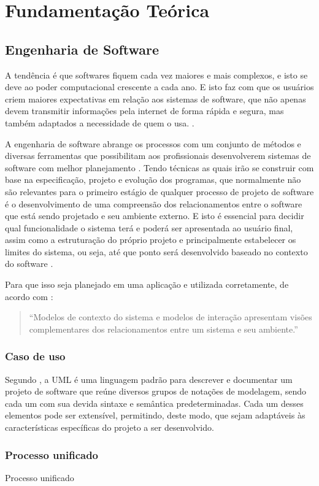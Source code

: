 \chapter{Fundamentação Teórica}\label{chp:LABEL_CHP_2}

\section{Engenharia de Software}
A tendência é que softwares fiquem cada vez maiores e mais complexos, e isto se deve ao poder computacional crescente a cada ano. E isto faz com que os usuários criem maiores expectativas em relação aos sistemas de software, que não apenas devem transmitir informações pela internet de forma rápida e segura, mas também adaptados a necessidade de quem o usa. \cite{SOMMERVILE}.

A engenharia de software abrange os processos com um conjunto de métodos e diversas ferramentas que possibilitam aos profissionais desenvolverem sistemas de software com melhor planejamento \cite{PRESSMAN}. Tendo técnicas as quais irão se construir com base na especificação, projeto e evolução dos programas, que normalmente não são relevantes para o primeiro estágio de qualquer processo de projeto de software é o desenvolvimento de uma compreensão dos relacionamentos entre o software que está sendo projetado e seu ambiente externo. E isto é essencial para decidir qual funcionalidade o sistema terá e poderá ser apresentada ao usuário final, assim como a estruturação do próprio projeto e principalmente estabelecer os limites do sistema, ou seja, até que ponto será desenvolvido baseado no contexto do software \cite{SOMMERVILE}.

Para que isso seja planejado em uma aplicação e utilizada corretamente, de acordo com \cite[p.126]{SOMMERVILE}: \begin{quote}
    “Modelos de contexto do sistema e modelos de interação apresentam visões complementares dos relacionamentos entre um sistema e seu ambiente.”
\end{quote} 
\subsection{Caso de uso}
Segundo , a UML é uma linguagem padrão para descrever e documentar um projeto de software que reúne diversos grupos de notações de modelagem, sendo cada um com sua devida sintaxe e semântica predeterminadas. Cada um desses elementos pode ser extensível, permitindo, deste modo, que sejam adaptáveis às características específicas do projeto a ser desenvolvido.
 \cite{PRESSMAN}
\subsection{Processo unificado}
Processo unificado
